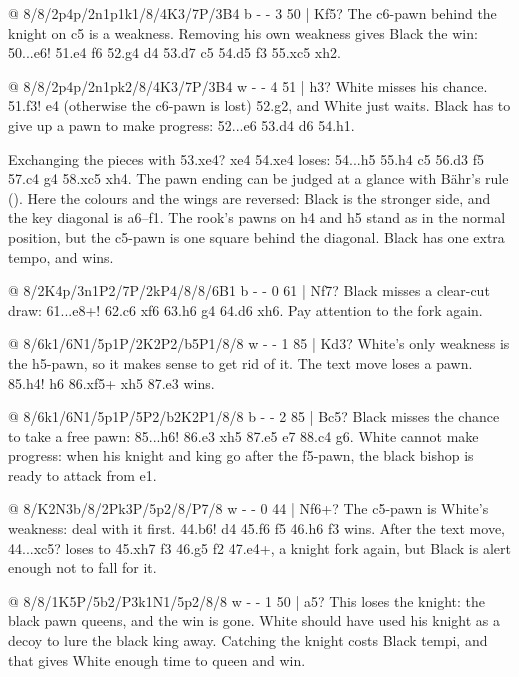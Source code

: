 @ 8/8/2p4p/2n1p1k1/8/4K3/7P/3B4 b - - 3 50 | Kf5?
The c6-pawn behind the knight on c5 is a weakness. Removing his own weakness gives Black the win:
50...\N e6! 51.\K e4 \K f6 52.\B g4 \N d4 53.\B d7 c5 54.\K d5 \N f3 55.\K xc5 \N xh2.

@ 8/8/2p4p/2n1pk2/8/4K3/7P/3B4 w - - 4 51 | h3?
White misses his chance. 51.\B f3! e4 (otherwise the c6-pawn is lost) 52.\B g2, and White just
waits. Black has to give up a pawn to make progress: 52...\K e6 53.\K d4 \K d6 54.\B h1.

Exchanging the pieces with 53.\B xe4? \N xe4 54.\K xe4 loses: 54...h5 55.h4 c5 56.\K d3 \K f5
57.\K c4 \K g4 58.\K xc5 \K xh4. The pawn ending can be judged at a glance with Bähr's rule
(). Here the colours and the wings are reversed: Black is the stronger side, and the key diagonal is
a6--f1. The rook's pawns on h4 and h5 stand as in the normal position, but the c5-pawn is one
square behind the diagonal. Black has one extra tempo, and wins.

@ 8/2K4p/3n1P2/7P/2kP4/8/8/6B1 b - - 0 61 | Nf7?
Black misses a clear-cut draw: 61...\N e8+! 62.\K c6 \N xf6
63.h6 \N g4 64.\K d6 \N xh6. Pay attention to the fork again.

@ 8/6k1/6N1/5p1P/2K2P2/b5P1/8/8 w - - 1 85 | Kd3?
White's only weakness is the h5-pawn, so it makes sense to get rid of it. The text move loses a
pawn. 85.\N h4! \K h6 86.\N xf5+ \K xh5 87.\N e3 wins.

@ 8/6k1/6N1/5p1P/5P2/b2K2P1/8/8 b - - 2 85 | Bc5?
Black misses the chance to take a free pawn: 85...\K h6! 86.\K e3 \K xh5 87.\N e5 \B e7 88.\N c4
\K g6. White cannot make progress: when his knight and king go after the f5-pawn, the black bishop
is ready to attack from e1.

@ 8/K2N3b/8/2Pk3P/5p2/8/P7/8 w - - 0 44 | Nf6+?
The c5-pawn is White's weakness: deal with it first.
44.\K b6! \K d4 45.\N f6 \B f5 46.h6 f3 wins. After the text move, 44...\K xc5? loses to 45.\N xh7
f3 46.\N g5 f2 47.\N e4+, a knight fork again, but Black is alert enough not to
fall for it.

@ 8/8/1K5P/5b2/P3k1N1/5p2/8/8 w - - 1 50 | a5?
This loses the knight: the black pawn queens, and the win is gone. White should have used his
knight as a decoy to lure the black king away. Catching the knight costs Black tempi, and that
gives White enough time to queen and win.

